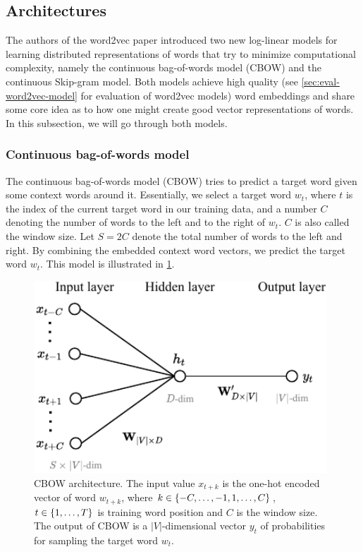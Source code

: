 \subsection{Architectures}
The authors of the word2vec paper introduced two new log-linear models for learning distributed representations of words that try to minimize computational complexity, namely the continuous bag-of-words model (CBOW) and the continuous Skip-gram model. Both models achieve high quality (see \cref{sec:eval-word2vec-model} for evaluation of word2vec models) word embeddings and share some core idea as to how one might create good vector representations of words. In this subsection, we will go through both models.

\subsubsection{Continuous bag-of-words model}
The continuous bag-of-words model (CBOW) tries to predict a target word given some context words around it. Essentially, we select a target word $w_t$, where $t$ is the index of the current target word in our training data, and a number $C$ denoting the number of words to the left and to the right of $w_t$. $C$ is also called the window size. Let $S=2C$ denote the total number of words to the left and right. By combining the embedded context word vectors, we predict the target word $w_t$. This model is illustrated in \cref{fig:cbow-model}.

\begin{figure}[H]
    \centering
    \includegraphics[width=11cm]{thesis/figures/cbow_cropped.pdf}
    \caption{CBOW architecture. The input value $x_{t+k}$ is the one-hot encoded vector of word $w_{t+k}$, where $k \in \left\{-C, \ldots, -1, 1, \ldots, C\right\}$, $t \in \left\{1, \ldots, T\right\}$ is training word position and $C$ is the window size. The output of CBOW is a $|V|$-dimensional vector $y_t$ of probabilities for sampling the target word $w_t$.}
    \label{fig:cbow-model}
\end{figure}

